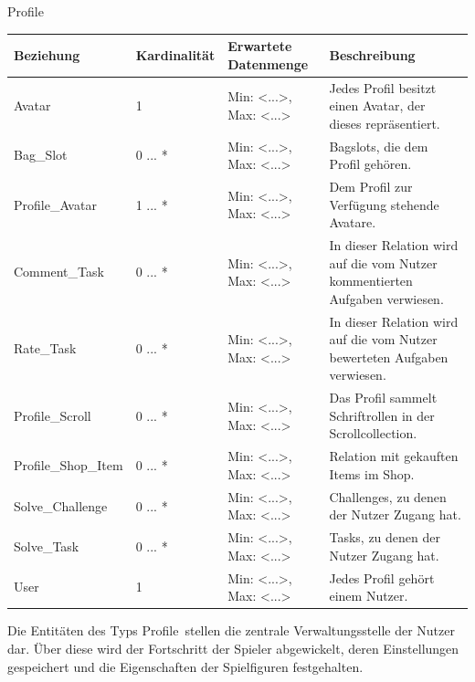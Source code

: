 \begin{entity}{70}{Profile}
\begin{center}
	\begin{longtable}{|m{4cm}|m{}|m{}|m{}|}
 	 \hline
 	 \textbf{Beziehung} & \textbf{Kardinalität} &  \textbf{Erwartete Datenmenge} & \textbf{Beschreibung} \\
  	\hline
  			Avatar & 1 & Min: <...>, Max: <...> & Jedes Profil besitzt einen Avatar, der dieses repräsentiert.\\
	  \hline
	    	Bag\_Slot & 0 ... * & Min: <...>, Max: <...> & Bagslots, die dem Profil gehören.\\
	  \hline
  			Profile\_Avatar & 1 ... *  & Min: <...>, Max: <...> & Dem Profil zur Verfügung stehende Avatare.\\
	  \hline
	    	Comment\_Task & 0 ... * & Min: <...>, Max: <...> & In dieser Relation wird auf die vom Nutzer kommentierten Aufgaben verwiesen. \\
	  \hline
	    	Rate\_Task & 0 ... * & Min: <...>, Max: <...> & In dieser Relation wird auf die vom Nutzer bewerteten Aufgaben verwiesen.\\
	  \hline
	    	Profile\_Scroll & 0 ... * & Min: <...>, Max: <...> & Das Profil sammelt Schriftrollen in der Scrollcollection.\\
	  \hline
	    	Profile\_Shop\_Item & 0 ... * & Min: <...>, Max: <...> & Relation mit gekauften Items im Shop.\\
	  \hline
			Solve\_Challenge & 0 ... * & Min: <...>, Max: <...> & Challenges, zu denen der Nutzer Zugang hat.\\
	  \hline 
	    	Solve\_Task & 0 ... * & Min: <...>, Max: <...> & Tasks, zu denen der Nutzer Zugang hat.\\
	  \hline
  	  		User & 1  & Min: <...>, Max: <...> &  Jedes Profil gehört einem Nutzer.\\
	  \hline
	\end{longtable}
\end{center}
Die Entitäten des Typs \glqq Profile\grqq~stellen die zentrale Verwaltungsstelle der Nutzer dar. Über diese wird der Fortschritt der Spieler abgewickelt, deren Einstellungen gespeichert und die Eigenschaften der Spielfiguren festgehalten. 
\end{entity}

